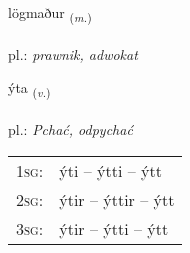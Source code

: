 \documentclass[frontgrid, backgrid]{flacards}\usepackage[]{graphicx}\usepackage[]{xcolor}
\begin{document}
\renewcommand{\flhead}{\vskip5pt \fboxsep=0pt {\small\bfseries\footnotesize Nafnorð | Noun}}
\renewcommand{\fcfoot}{\vskip5pt \fboxsep=0pt \hspace{2pt}{\small\bfseries\footnotesize 2K}}

\renewcommand{\blhead}{\vskip5pt {\small\bfseries\footnotesize Nafnorð | Noun }}
\renewcommand{\bcfoot}{\vskip5pt \hspace{2pt}{\small\bfseries\footnotesize 2K}}


{lögmaður \small{\textsubscript{(\textit{m.})}} \\[1ex] %
\textphonetic{[lœɣmaðʏr]} \\
pl.: \emph{prawnik, adwokat} \\  [2ex]
\renewcommand*{\arraystretch}{0.8}
}

\renewcommand{\flhead}{\vskip5pt \fboxsep=0pt {\small\bfseries\footnotesize Sagnorð | Verb}}
\renewcommand{\fcfoot}{\vskip5pt \fboxsep=0pt \hspace{2pt}{\small\bfseries\footnotesize 2K}}

\renewcommand{\blhead}{\vskip5pt {\small\bfseries\footnotesize Sagnorð | Verb }}
\renewcommand{\bcfoot}{\vskip5pt \hspace{2pt}{\small\bfseries\footnotesize 2K}}


{ýta \small{\textsubscript{(\textit{v.})}} \\[1ex] %
\textphonetic{[iːta]} \\
pl.: \emph{Pchać, odpychać} \\  [2ex]
\renewcommand*{\arraystretch}{0.8}
\begin{tabular}{p{1cm}l}
\textsc{1sg}: & ýti -- ýtti -- ýtt \\ 
\textsc{2sg}: & ýtir -- ýttir -- ýtt \\ 
\textsc{3sg}: & ýtir -- ýtti -- ýtt \\ 
\end{tabular}
}
\end{document}
